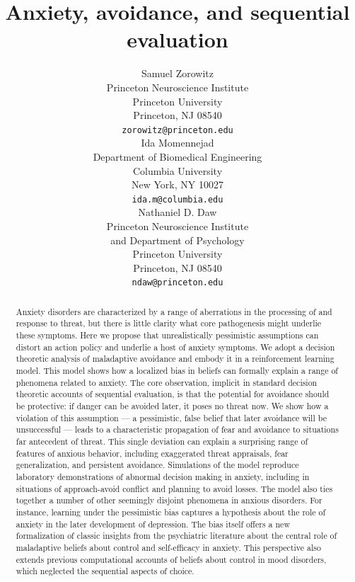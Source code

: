 \documentclass[11pt]{article} %
\title{Anxiety, avoidance, and sequential evaluation}
\author{
Samuel Zorowitz \\
Princeton Neuroscience Institute\\
Princeton University\\
Princeton, NJ 08540 \\
\texttt{zorowitz@princeton.edu} \\
\And
Ida Momennejad \\
Department of Biomedical Engineering\\
Columbia University\\
New York, NY 10027 \\
\texttt{ida.m@columbia.edu} \\
\And
Nathaniel D. Daw \\
Princeton Neuroscience Institute\\
and Department of Psychology\\
Princeton University\\
Princeton, NJ 08540 \\
\texttt{ndaw@princeton.edu} \\
}
\begin{document}
\maketitle

\begin{abstract}
Anxiety disorders are characterized by a range of aberrations in the processing of and response to threat, but there is little clarity what core pathogenesis might underlie these symptoms. Here we propose that unrealistically pessimistic assumptions can distort an action policy and underlie a host of anxiety symptoms. We adopt a decision theoretic analysis of maladaptive avoidance and embody it in a reinforcement learning model. This model shows how a localized bias in beliefs can formally explain a range of phenomena related to anxiety. The core observation, implicit in standard decision theoretic accounts of sequential evaluation, is that the potential for avoidance should be protective: if danger can be avoided later, it poses no threat now. We show how a violation of this assumption --- a pessimistic, false belief that later avoidance will be unsuccessful --- leads to a characteristic propagation of fear and avoidance to situations far antecedent of threat. This single deviation can explain a surprising range of features of anxious behavior, including exaggerated threat appraisals, fear generalization, and persistent avoidance. Simulations of the model reproduce laboratory demonstrations of abnormal decision making in anxiety, including in situations of approach-avoid conflict and planning to avoid losses. The model also ties together a number of other seemingly disjoint phenomena in anxious disorders. For instance, learning under the pessimistic bias captures a hypothesis about the role of anxiety in the later development of depression. The bias itself offers a new formalization of classic insights from the psychiatric literature about the central role of maladaptive beliefs about control and self-efficacy in anxiety. This perspective also extends previous computational accounts of beliefs about control in mood disorders, which neglected the sequential aspects of choice.
\end{abstract}


\end{document}
